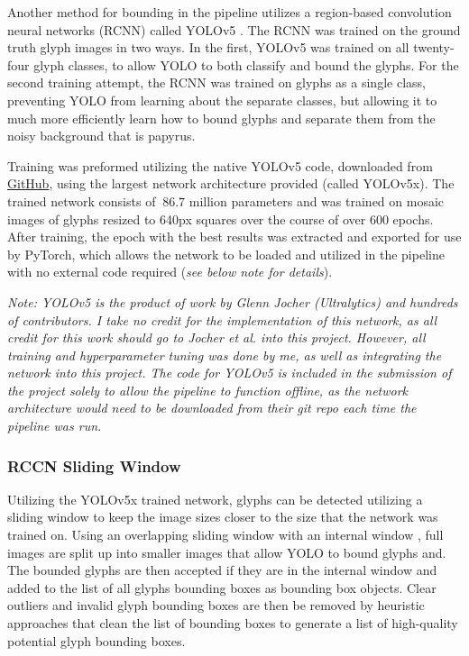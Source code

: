 Another method for bounding in the pipeline utilizes a region-based convolution neural networks (RCNN) called YOLOv5 \cite{YOLOv5}. The RCNN was trained on the ground truth glyph images in two ways. In the first, YOLOv5 was trained on all twenty-four glyph classes, to allow YOLO to both classify and bound the glyphs. For the second training attempt, the RCNN was trained on glyphs as a single class, preventing YOLO from learning about the separate classes, but allowing it to much more efficiently learn how to bound glyphs and separate them from the noisy background that is papyrus.

Training was preformed utilizing the native YOLOv5 code, downloaded from \href{https://github.com/ultralytics/yolov5}{GitHub}, using the largest network architecture provided (called YOLOv5x). The trained network consists of $~86.7$ million parameters and was trained on mosaic images of glyphs resized to 640px squares over the course of over 600 epochs. After training, the epoch with the best results was extracted and exported for use by PyTorch, which allows the network to be loaded and utilized in the pipeline with no external code required (\textit{see below note for details}).

\textit{Note: YOLOv5 is the product of work by Glenn Jocher (Ultralytics) and hundreds of contributors. I take no credit for the implementation of this network, as all credit for this work should go to Jocher et al. into this project. However, all training and hyperparameter tuning was done by me, as well as integrating the network into this project. The code for YOLOv5 is included in the submission of the project solely to allow the pipeline to function offline, as the network architecture would need to be downloaded from their git repo each time the pipeline was run.}

\subsubsection{RCCN Sliding Window}

Utilizing the YOLOv5x trained network, glyphs can be detected utilizing a sliding window to keep the image sizes closer to the size that the network was trained on. Using an overlapping sliding window with an internal window , full images are split up into smaller images that allow YOLO to bound glyphs and. The bounded glyphs are then accepted if they are in the internal window and added to the list of all glyphs bounding boxes as bounding box objects. Clear outliers and invalid glyph bounding boxes are then be removed by heuristic approaches that clean the list of bounding boxes to generate a list of high-quality potential glyph bounding boxes.

